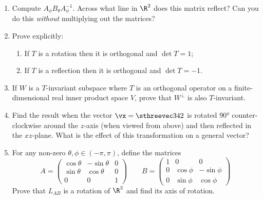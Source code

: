 \begin{exercises}
\begin{enumerate}
 	\item Compute $A_\phi B_\theta A_\phi^{-1}$. Across what line in $\R^2$ does this matrix reflect? Can you do this \emph{without} multiplying out the matrices?
  
  \item Prove explicitly:
  \begin{enumerate}
    \item If $T$ is a rotation then it is orthogonal and $\det T=1$;
    \item If $T$ is a reflection then it is orthogonal and $\det T=-1$.
  \end{enumerate}
  
  \item If $W$ is a $T$-invariant subspace where $T$ is an orthogonal operator on a finite-dimensional real inner product space $V$, prove that $W^\perp$ is also $T$-invariant.

	\item Find the result when the vector $\vx=\sthreevec 342$ is rotated \ang{90} counter-clockwise around the $z$-axis (when viewed from above) and then reflected in the $xz$-plane. What is the effect of this transformation on a general vector?
  
  \item For any non-zero $\theta,\phi\in(-\pi,\pi)$, define the matrices
  \[A=\begin{pmatrix}
  \cos\theta&-\sin\theta&0\\
  \sin\theta&\cos\theta&0\\
  0&0&1
  \end{pmatrix}\qquad B=\begin{pmatrix}
  1&0&0\\
  0&\cos\phi&-\sin\phi\\
  0&\sin\phi&\cos\phi
  \end{pmatrix}\]
  Prove that $L_{AB}$ is a rotation of $\R^3$ and find its axis of rotation.

 	
  
%  
%   
	

\end{enumerate}
\end{exercises}
